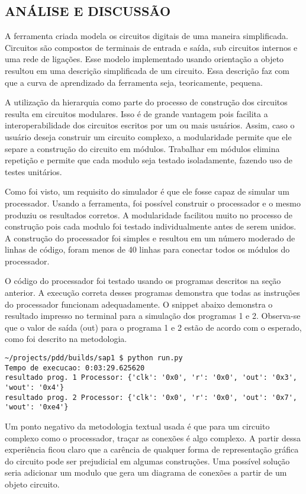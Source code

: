 \subsection{ANÁLISE E DISCUSSÃO}
A ferramenta criada modela os circuitos digitais de uma maneira simplificada.
Circuitos são compostos de terminais de entrada e saída,  sub circuitos internos e uma rede de ligações.
Esse modelo implementado usando orientação a objeto resultou em uma descrição simplificada de um circuito.
Essa descrição faz com que a curva de aprendizado da ferramenta seja, teoricamente, pequena.

A utilização da hierarquia como parte do processo de construção dos circuitos resulta em circuitos modulares.
Isso é de grande vantagem pois facilita a interoperabilidade dos circuitos escritos por um ou mais usuários.
Assim, caso o usuário deseja construir um circuito complexo, a modularidade permite que ele separe a construção do circuito em módulos.
Trabalhar em módulos elimina repetição e permite que cada modulo seja testado isoladamente, fazendo uso de testes unitários.

Como foi visto, um requisito do simulador é que ele fosse capaz de simular um processador.
Usando a ferramenta, foi possível construir o processador e o mesmo produziu os resultados corretos. 
A modularidade facilitou muito no processo de construção pois cada modulo foi testado individualmente antes de serem unidos.
A construção do processador foi simples e resultou em um número moderado de linhas de código, foram menos de 40 linhas para conectar todos os módulos do processador.

O código do processador foi testado usando os programas descritos na seção anterior.
A execução correta desses programas demonstra que todas as instruções do processador funcionam adequadamente.
O snippet abaixo demonstra o resultado impresso no terminal para a simulação dos programas 1 e 2.
Observa-se que o valor de saída (out) para o programa 1 e 2 estão de acordo com o esperado, como foi descrito na metodologia.

\begin{lstlisting}
~/projects/pdd/builds/sap1 $ python run.py 
Tempo de execucao: 0:03:29.625620
resultado prog. 1 Processor: {'clk': '0x0', 'r': '0x0', 'out': '0x3', 'wout': '0x4'}
resultado prog. 2 Processor: {'clk': '0x0', 'r': '0x0', 'out': '0x7', 'wout': '0xe4'}
\end{lstlisting}

Um ponto negativo da metodologia textual usada é que para um circuito complexo como o processador, traçar as conexões é algo complexo.
A partir dessa experiência ficou claro que a carência de qualquer forma de representação gráfica do circuito pode ser prejudicial em algumas construções.
Uma possível solução seria adicionar um modulo que gera um diagrama de conexões a partir de um objeto circuito.

